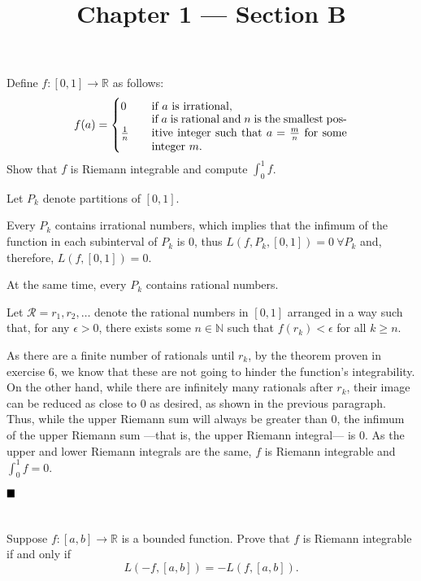 \documentclass[11pt, a4paper, tikz]{article}
\newcommand{\centsection}[1]{
	\section*{\centering{#1}}
}
\renewcommand{\qed}{\hfill\blacksquare}
\newcommand{\Int}[2]{\displaystyle \int_{#1}^{#2}}
\newcommand{\naturals}{
	\ensuremath{\mathbb{N}}
}
\newcommand{\reals}{
	\ensuremath{\mathbb{R}}
}
\begin{document}
	\title{\textbf{Chapter 1 — Section B}}
	\maketitle
	\centsection{Exercise 1}
	
	\begin{formulationBox}
		Define $f:[0,1]\rightarrow\reals$ as follows:
		\[
			f(a) =
			\begin{cases}
				0 &\quad \textrm{if $a$ is irrational,}\\
				\frac{1}{n} &\quad \parbox{.5\linewidth}{if $a$ is rational and $n$ is the smallest positive integer such that $a=\frac{m}{n}$ for some integer $m$.}
			\end{cases}
		\]
		Show that $f$ is Riemann integrable and compute $\Int{0}{1}f$.
	\end{formulationBox}
	
	Let $P_k$ denote partitions of $[0,1]$.
	
	Every $P_k$ contains irrational numbers, which implies that the infimum of the function in each subinterval of $P_k$ is 0, thus $L(f, P_k, [0,1]) = 0\ \forall P_k$ and, therefore, $L(f, [0,1]) = 0$.
	
	At the same time, every $P_k$ contains rational numbers.
	
	Let $\mathcal{R} = r_1, r_2, \dots$ denote the rational numbers in $[0, 1]$ arranged in a way such that, for any $\epsilon>0$, there exists some $n\in\naturals$ such that $f(r_k)<\epsilon$ for all $k\geq n$.
	
	As there are a finite number of rationals until $r_k$, by the theorem proven in exercise 6, we know that these are not going to hinder the function's integrability. On the other hand, while there are infinitely many rationals after $r_k$, their image can be reduced as close to 0 as desired, as shown in the previous paragraph. Thus, while the upper Riemann sum will always be greater than 0, the infimum of the upper Riemann sum —that is, the upper Riemann integral— is 0. As the upper and lower Riemann integrals are the same, $f$ is Riemann integrable and $\Int{0}{1}f = 0$.
	
	$\qed$
	
	\centsection{Exercise 2}
	
	\begin{formulationBox}
		Suppose $f:[a,b]\rightarrow\reals$ is a bounded function. Prove that $f$ is Riemann integrable if and only if \[L(-f, [a,b]) = -L(f, [a,b]).\]
	\end{formulationBox}
	
\end{document}
